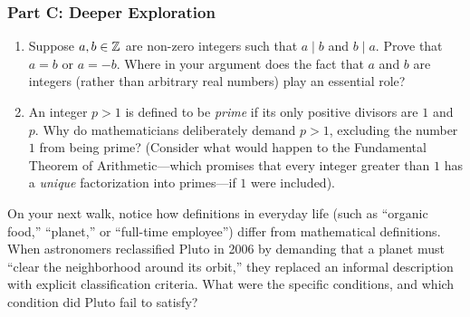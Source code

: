 \subsubsection*{Part C: Deeper Exploration}
\begin{enumerate}[resume]
\item Suppose $a, b \in \mathbb{Z}$ are non-zero integers such that $a \mid b$ and $b \mid a$. Prove that $a = b$ or $a = -b$. Where in your argument does the fact that $a$ and $b$ are integers (rather than arbitrary real numbers) play an essential role?
\item An integer $p > 1$ is defined to be \emph{prime} if its only positive divisors are $1$ and $p$. Why do mathematicians deliberately demand $p > 1$, excluding the number $1$ from being prime? (Consider what would happen to the Fundamental Theorem of Arithmetic---which promises that every integer greater than $1$ has a \emph{unique} factorization into primes---if $1$ were included).
\end{enumerate}

\begin{walkbox}
On your next walk, notice how definitions in everyday life (such as ``organic food,'' ``planet,'' or ``full-time employee'') differ from mathematical definitions. When astronomers reclassified Pluto in 2006 by demanding that a planet must ``clear the neighborhood around its orbit,'' they replaced an informal description with explicit classification criteria. What were the specific conditions, and which condition did Pluto fail to satisfy?
\end{walkbox}

\newpage
